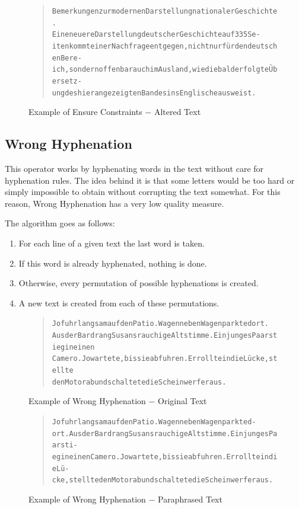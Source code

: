 \documentclass[11pt]{reportAlternative}
\begin{document}
\begin{figure}[H]
	\begin{quote}
		\begin{alltt}
			Bemerkungen zur modernen Darstellung nationaler Geschichte.
			Eine neuere Darstellung deutscher Geschichte auf 335 Se-
			iten kommt einer Nachfrage entgegen, nicht nur für den deutschen Bere-
			ich, sondern offenbar auch im Ausland, wie die bald erfolgte Übersetz-
			ung des hier angezeigten Bandes ins Englische ausweist.
		\end{alltt}
	\end{quote}
	\caption{Example of Ensure Constraints $-$ Altered Text}
\end{figure}

\subsection{Wrong Hyphenation}
This operator works by hyphenating words in the text without care for hyphenation rules. The idea behind it is that some letters would be too hard or simply impossible to obtain without corrupting the text somewhat.
For this reason, Wrong Hyphenation has a very low quality measure.

The algorithm goes as follows:
\begin{enumerate}
\item For each line of a given text the last word is taken.
\item If this word is already hyphenated, nothing is done.
\item Otherwise, every permutation of possible hyphenations is created.
\item A new text is created from each of these permutations.
\end{enumerate}

\begin{figure}[H]
	\begin{quote}
		\begin{alltt}
			Jo fuhr langsam auf den Patio. Wagen neben Wagen parkte dort. 
			Aus der Bar drang Susans rauchige Altstimme. Ein junges Paar stieg in einen
			Camero. Jo wartete, bis sie abfuhren. Er rollte in die Lücke, stellte
			den Motor ab und schaltete die Scheinwerfer aus.
		\end{alltt}
	\end{quote}
	\caption{Example of Wrong Hyphenation $-$ Original Text}
\end{figure}

\begin{figure}[H]
	\begin{quote}
		\begin{alltt}
			Jo fuhr langsam auf den Patio. Wagen neben Wagen parkte d-
			ort. Aus der Bar drang Susans rauchige Altstimme. Ein junges Paar sti-
			eg in einen Camero. Jo wartete, bis sie abfuhren. Er rollte in die Lü-
			cke, stellte den Motor ab und schaltete die Scheinwerfer aus.
		\end{alltt}
	\end{quote}
	\caption{Example of Wrong Hyphenation $-$ Paraphrased Text}
\end{figure}
\end{document}
